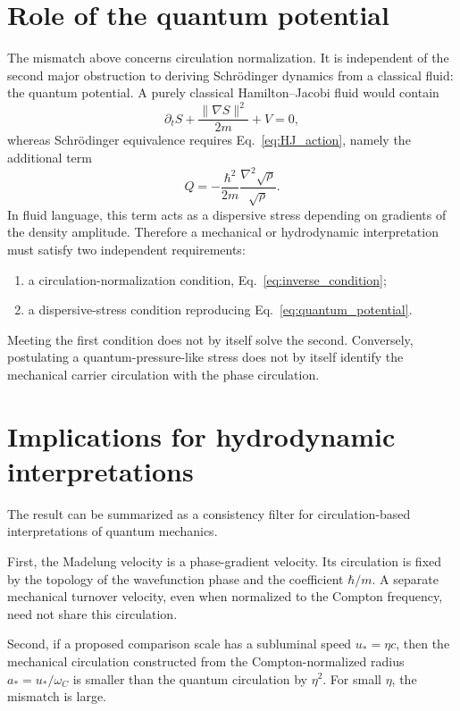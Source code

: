 \documentclass[11pt,a4paper]{article}
\newcommand{\omegaC}{\omega_{C}}
\newcommand{\uStar}{u_{*}}
\newcommand{\aStar}{a_{*}}
\begin{document}
\section{Role of the quantum potential}

The mismatch above concerns circulation normalization. It is independent of the second major obstruction to deriving Schr\"odinger dynamics from a classical fluid: the quantum potential. A purely classical Hamilton--Jacobi fluid would contain
\begin{equation}
    \partial_t S+\frac{\lVert\nabla S\rVert^2}{2m}+V=0,
\end{equation}
whereas Schr\"odinger equivalence requires Eq.~\eqref{eq:HJ_action}, namely the additional term
\begin{equation}
    Q
    =
    -\frac{\hbar^2}{2m}
    \frac{\nabla^2\sqrt{\rho}}{\sqrt{\rho}}.
\end{equation}
In fluid language, this term acts as a dispersive stress depending on gradients of the density amplitude. Therefore a mechanical or hydrodynamic interpretation must satisfy two independent requirements:
\begin{enumerate}
    \item a circulation-normalization condition, Eq.~\eqref{eq:inverse_condition};
    \item a dispersive-stress condition reproducing Eq.~\eqref{eq:quantum_potential}.
\end{enumerate}
Meeting the first condition does not by itself solve the second. Conversely, postulating a quantum-pressure-like stress does not by itself identify the mechanical carrier circulation with the phase circulation.

\section{Implications for hydrodynamic interpretations}

The result can be summarized as a consistency filter for circulation-based interpretations of quantum mechanics.

First, the Madelung velocity is a phase-gradient velocity. Its circulation is fixed by the topology of the wavefunction phase and the coefficient $\hbar/m$. A separate mechanical turnover velocity, even when normalized to the Compton frequency, need not share this circulation.

Second, if a proposed comparison scale has a subluminal speed $\uStar=\eta c$, then the mechanical circulation constructed from the Compton-normalized radius $\aStar=\uStar/\omegaC$ is smaller than the quantum circulation by $\eta^2$. For small $\eta$, the mismatch is large.
\end{document}
